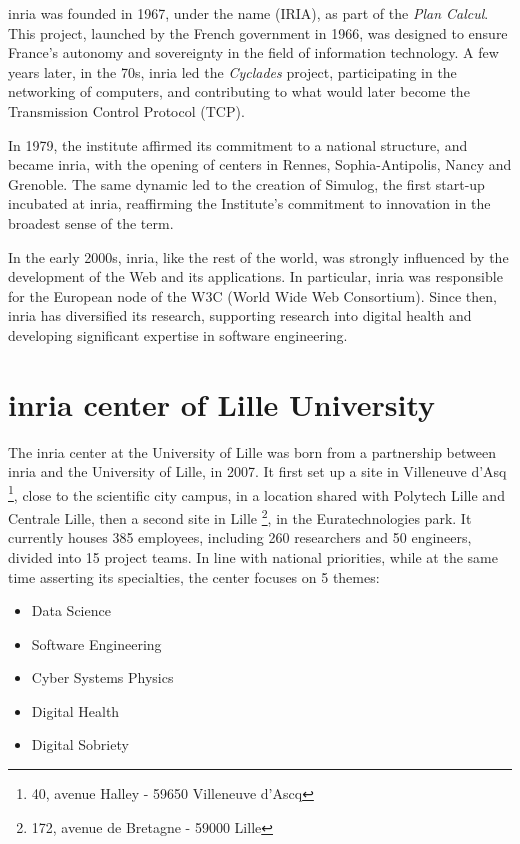 \gls{inria} was founded in 1967, under the name  (IRIA), as part of the \textit{Plan Calcul}\cite{PlanCalcul}. This project, launched by the French government in 1966, was designed to ensure France's autonomy and sovereignty in the field of information technology.
A few years later, in the 70s, \gls{inria} led the \textit{Cyclades} project, participating in the networking of computers, and contributing to what would later become the Transmission Control Protocol (TCP).

In 1979, the institute affirmed its commitment to a national structure, and became \gls{inria}, with the opening of centers in Rennes, Sophia-Antipolis, Nancy and Grenoble. The same dynamic led to the creation of Simulog, the first start-up incubated at \gls{inria}, reaffirming the Institute's commitment to innovation in the broadest sense of the term.

In the early 2000s, \gls{inria}, like the rest of the world, was strongly influenced by the development of the Web and its applications. In particular, \gls{inria} was responsible for the European node of the W3C (World Wide Web Consortium). Since then, \gls{inria} has diversified its research, supporting research into digital health and developing significant expertise in software engineering. 

\section{\gls{inria} center of Lille University}
The \gls{inria} center at the University of Lille was born from a partnership between \gls{inria} and the University of Lille, in 2007. It first set up a site in Villeneuve d'Asq \footnote{40, avenue Halley - 59650 Villeneuve d'Ascq}, close to the scientific city campus, in a location shared with Polytech Lille and Centrale Lille, then a second site in Lille \footnote{172, avenue de Bretagne - 59000 Lille}, in the Euratechnologies park. It currently houses 385 employees, including 260 researchers and 50 engineers, divided into 15 project teams.
In line with national priorities, while at the same time asserting its specialties, the center focuses on 5 themes: 
\begin{multicols}{2}
    
\begin{itemize}
    \item Data Science
    \item Software Engineering
    \item Cyber Systems Physics
    \item Digital Health
    \item Digital Sobriety
\end{itemize}
\end{multicols}

